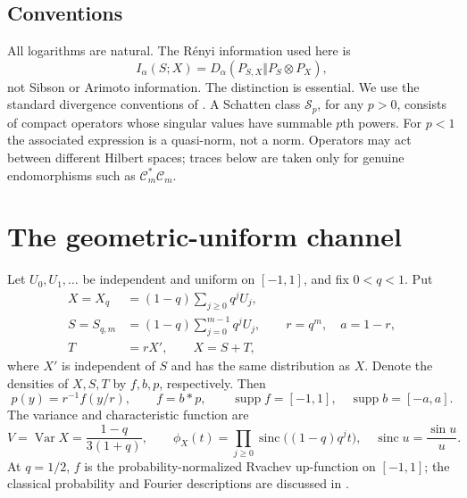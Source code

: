 \documentclass[11pt,a4paper]{article}
\numberwithin{equation}{section}
\theoremstyle{definition}\newtheorem{definition}[theorem]{Definition}
\theoremstyle{remark}\newtheorem{remark}[theorem]{Remark}
\newcommand{\Var}{\operatorname{Var}}\newcommand{\Cov}{\operatorname{Cov}}
\newcommand{\supp}{\operatorname{supp}}\newcommand{\rank}{\operatorname{rank}}
\newcommand{\sinc}{\operatorname{sinc}}\newcommand{\HS}{\mathrm{HS}}
\newcommand{\calC}{\mathcal C_m}\newcommand{\calP}{\mathcal P}
\begin{document}
\subsection{Conventions}
All logarithms are natural. The R\'enyi information used here is
\[
 I_\alpha(S;X)=D_\alpha(P_{S,X}\Vert P_S\otimes P_X),
\]
not Sibson or Arimoto information. The distinction is essential. We use the standard divergence conventions of \cite{renyi}. A Schatten class $\mathcal S_p$, for any $p>0$, consists of compact operators whose singular values have summable $p$th powers. For $p<1$ the associated expression is a quasi-norm, not a norm. Operators may act between different Hilbert spaces; traces below are taken only for genuine endomorphisms such as $\calC^*\calC$.

\section{The geometric-uniform channel}
\label{sec:channel}
Let $U_0,U_1,\ldots$ be independent and uniform on $[-1,1]$, and fix $0<q<1$. Put
\begin{align}
 X=X_q&=(1-q)\sum_{j\ge0}q^jU_j,\label{eq:X}\\
 S=S_{q,m}&=(1-q)\sum_{j=0}^{m-1}q^jU_j,\qquad r=q^m,\quad a=1-r,
 \label{eq:S}\\
 T&=rX',\qquad X=S+T,\label{eq:decomp}
\end{align}
where $X'$ is independent of $S$ and has the same distribution as $X$. Denote the densities of $X,S,T$ by $f,b,p$, respectively. Then
\begin{equation}
 p(y)=r^{-1}f(y/r),\qquad f=b*p,
 \qquad \supp f=[-1,1],\quad \supp b=[-a,a].
 \label{eq:densities}
\end{equation}
The variance and characteristic function are
\begin{equation}
 V=\Var X=\frac{1-q}{3(1+q)},\qquad
 \phi_X(t)=\prod_{j\ge0}\sinc\bigl((1-q)q^jt\bigr),
 \quad \sinc u=\frac{\sin u}{u}.
 \label{eq:variance-product}
\end{equation}
At $q=1/2$, $f$ is the probability-normalized Rvachev up-function on $[-1,1]$; the classical probability and Fourier descriptions are discussed in \cite{arias}.
\end{document}
